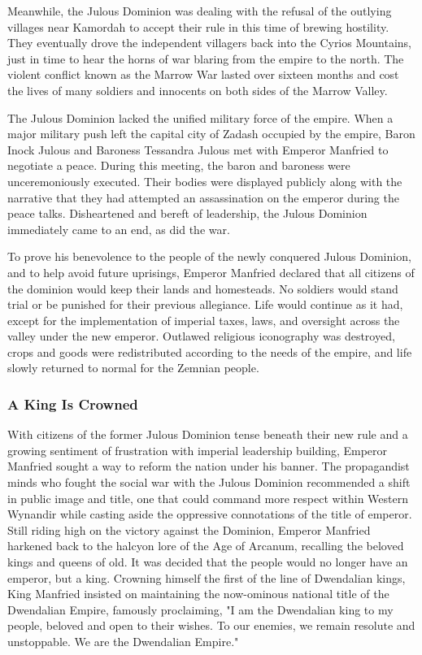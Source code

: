 \documentclass[10pt,a4paper,twoside,bg=print,twocolumn,openany,nodeprecatedcode]{dndbook}
\begin{document}
Meanwhile, the Julous Dominion was dealing with the refusal of the outlying villages near Kamordah to accept their rule in this time of brewing hostility. They eventually drove the independent villagers back into the Cyrios Mountains, just in time to hear the horns of war blaring from the empire to the north. The violent conflict known as the Marrow War lasted over sixteen months and cost the lives of many soldiers and innocents on both sides of the Marrow Valley.

The Julous Dominion lacked the unified military force of the empire. When a major military push left the capital city of Zadash occupied by the empire, Baron Inock Julous and Baroness Tessandra Julous met with Emperor Manfried to negotiate a peace. During this meeting, the baron and baroness were unceremoniously executed. Their bodies were displayed publicly along with the narrative that they had attempted an assassination on the emperor during the peace talks. Disheartened and bereft of leadership, the Julous Dominion immediately came to an end, as did the war.

To prove his benevolence to the people of the newly conquered Julous Dominion, and to help avoid future uprisings, Emperor Manfried declared that all citizens of the dominion would keep their lands and homesteads. No soldiers would stand trial or be punished for their previous allegiance. Life would continue as it had, except for the implementation of imperial taxes, laws, and oversight across the valley under the new emperor. Outlawed religious iconography was destroyed, crops and goods were redistributed according to the needs of the empire, and life slowly returned to normal for the Zemnian people.

\subsubsection{A King Is Crowned}
With citizens of the former Julous Dominion tense beneath their new rule and a growing sentiment of frustration with imperial leadership building, Emperor Manfried sought a way to reform the nation under his banner. The propagandist minds who fought the social war with the Julous Dominion recommended a shift in public image and title, one that could command more respect within Western Wynandir while casting aside the oppressive connotations of the title of emperor. Still riding high on the victory against the Dominion, Emperor Manfried harkened back to the halcyon lore of the Age of Arcanum, recalling the beloved kings and queens of old. It was decided that the people would no longer have an emperor, but a king. Crowning himself the first of the line of Dwendalian kings, King Manfried insisted on maintaining the now-ominous national title of the Dwendalian Empire, famously proclaiming, "I am the Dwendalian king to my people, beloved and open to their wishes. To our enemies, we remain resolute and unstoppable. We are the Dwendalian Empire."
\end{document}
